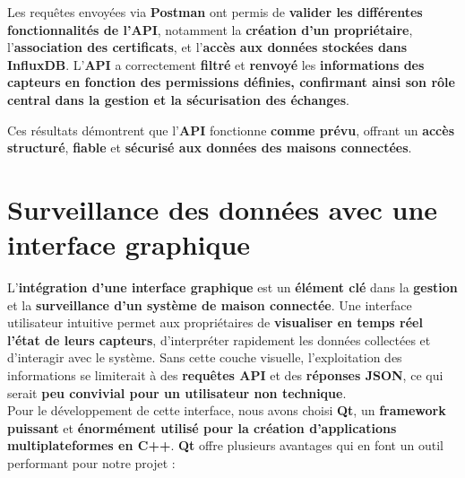 \documentclass[10pt, a4paper]{report}
\begin{document}
	Les requêtes envoyées via \textbf{Postman} ont permis de \textbf{valider les différentes fonctionnalités de l’API}, notamment la \textbf{création d’un propriétaire}, l’\textbf{association des certificats}, et l’\textbf{accès aux données stockées dans InfluxDB}. L'\textbf{API} a correctement \textbf{filtré} et \textbf{renvoyé} les \textbf{informations des capteurs en fonction des permissions définies, confirmant ainsi son rôle central dans la gestion et la sécurisation des échanges}.
	
	Ces résultats démontrent que l’\textbf{API} fonctionne \textbf{comme prévu}, offrant un \textbf{accès structuré}, \textbf{fiable} et\textbf{ sécurisé aux données des maisons connectées}.\newpage
	
	\section{Surveillance des données avec une interface graphique}
	L’\textbf{intégration d’une interface graphique} est un \textbf{élément clé} dans la \textbf{gestion} et la \textbf{surveillance d’un système de maison connectée}. Une interface utilisateur intuitive permet aux propriétaires de \textbf{visualiser en temps réel l’état de leurs capteurs}, d’interpréter rapidement les données collectées et d’interagir avec le système. Sans cette couche visuelle, l’exploitation des informations se limiterait à des \textbf{requêtes API} et des \textbf{réponses JSON}, ce qui serait\textbf{ peu convivial pour un utilisateur non technique}.\\
	
	Pour le développement de cette interface, nous avons choisi \textbf{Qt}, un \textbf{framework puissant} et \textbf{énormément utilisé pour la création d’applications multiplateformes en C++}. \textbf{Qt} offre plusieurs avantages qui en font un outil performant pour notre projet :
	
\end{document}
